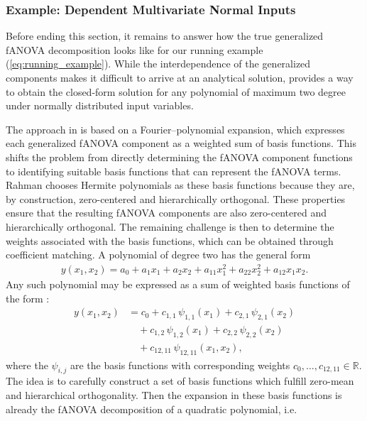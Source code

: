 \subsubsection{Example: Dependent Multivariate Normal Inputs}
Before ending this section, it remains to answer how the true generalized fANOVA decomposition looks like for our running example (\autoref{eq:running_example}). While the interdependence of the generalized components makes it difficult to arrive at an analytical solution, \cite{rahman2014} provides a way to obtain the closed-form solution for any polynomial of maximum two degree under normally distributed input variables.\par
The approach in \cite{rahman2014} is based on a Fourier–polynomial expansion, 
which expresses each generalized fANOVA component as a weighted sum of basis functions. 
This shifts the problem from directly determining the fANOVA component functions 
to identifying suitable basis functions that can represent the fANOVA terms. 
Rahman chooses Hermite polynomials as these basis functions because they are, 
by construction, zero-centered and hierarchically orthogonal. 
These properties ensure that the resulting fANOVA components are also 
zero-centered and hierarchically orthogonal. 
The remaining challenge is then to determine the weights associated with the basis functions, 
which can be obtained through coefficient matching.
A polynomial of degree two has the general form
\begin{align}\label{eq:quadratic_polynomial}
    y(x_1,x_2)
    = a_0 + a_1 x_1 + a_2 x_2 
      + a_{11} x_1^2 + a_{22} x_2^2 + a_{12} x_1 x_2.
\end{align}
Any such polynomial may be expressed as a sum of weighted basis functions of the form \citep{nagler2024linalg}:
\[
\begin{aligned}
y(x_1,x_2)
    &= c_0 
     + c_{1,1}\,\psi_{1,1}(x_1) 
     + c_{2,1}\,\psi_{2,1}(x_2) \\ 
    &\quad
     + c_{1,2}\,\psi_{1,2}(x_1)
     + c_{2,2}\,\psi_{2,2}(x_2) \\
    &\quad
     + c_{12,11}\,\psi_{12,11}(x_1,x_2),
\end{aligned}
\]
where the $\psi_{i,j}$ are the basis functions with corresponding weights 
$c_0, \dots , c_{12,11} \in \mathbb{R}$.
The idea is to carefully construct a set of basis functions which fulfill zero-mean 
and hierarchical orthogonality. Then the expansion in these basis functions is already the 
fANOVA decomposition of a quadratic polynomial, i.e.
